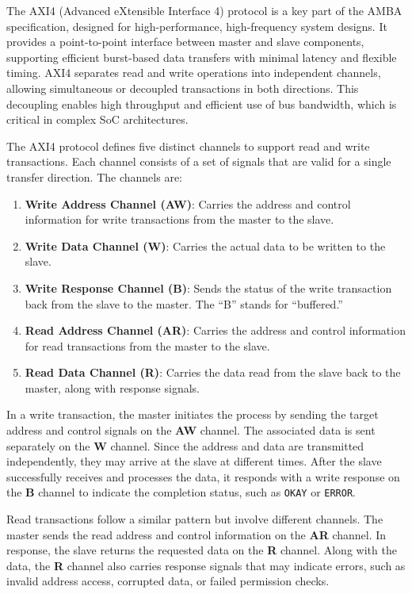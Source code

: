 The AXI4 (Advanced eXtensible Interface 4) protocol is a key part of the AMBA specification, designed for high-performance, high-frequency system designs. It provides a point-to-point interface between master and slave components, supporting efficient burst-based data transfers with minimal latency and flexible timing. AXI4 separates read and write operations into independent channels, allowing simultaneous or decoupled transactions in both directions. This decoupling enables high throughput and efficient use of bus bandwidth, which is critical in complex SoC architectures.


The AXI4 protocol defines five distinct channels to support read and write transactions. Each channel consists of a set of signals that are valid for a single transfer direction. The channels are:

\begin{enumerate}
    \item \textbf{Write Address Channel (AW)}: Carries the address and control information for write transactions from the master to the slave.
    \item \textbf{Write Data Channel (W)}: Carries the actual data to be written to the slave.
    \item \textbf{Write Response Channel (B)}: Sends the status of the write transaction back from the slave to the master. The “B” stands for “buffered.”
    \item \textbf{Read Address Channel (AR)}: Carries the address and control information for read transactions from the master to the slave.
    \item \textbf{Read Data Channel (R)}: Carries the data read from the slave back to the master, along with response signals.
\end{enumerate}

In a write transaction, the master initiates the process by sending the target address and control signals on the \textbf{AW} channel. The associated data is sent separately on the \textbf{W} channel. Since the address and data are transmitted independently, they may arrive at the slave at different times. After the slave successfully receives and processes the data, it responds with a write response on the \textbf{B} channel to indicate the completion status, such as \texttt{OKAY} or \texttt{ERROR}.

Read transactions follow a similar pattern but involve different channels. The master sends the read address and control information on the \textbf{AR} channel. In response, the slave returns the requested data on the \textbf{R} channel. Along with the data, the \textbf{R} channel also carries response signals that may indicate errors, such as invalid address access, corrupted data, or failed permission checks.

